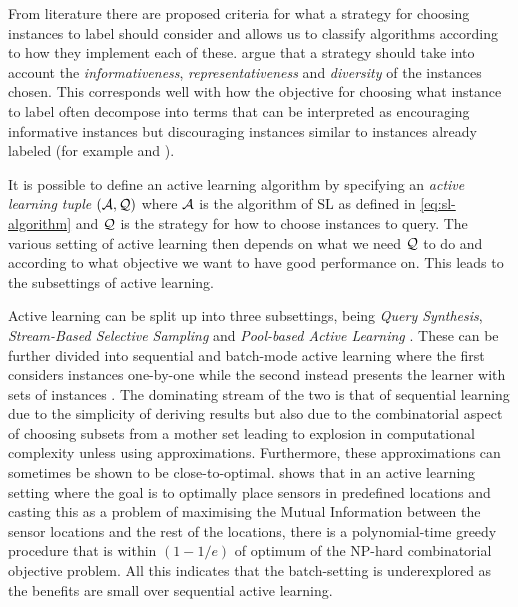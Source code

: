 From literature there are proposed criteria for what a strategy for choosing
instances to label should consider and allows us to classify algorithms
according to how they implement each of these.
\cite{wu18_pool_based_sequen_activ_learn_regres} argue that a strategy should
take into account the \emph{informativeness}, \emph{representativeness} and
\emph{diversity} of the instances chosen. This corresponds well with how the
objective for choosing what instance to label often decompose into terms that
can be interpreted as encouraging informative instances but discouraging instances similar to instances already labeled (for
example \cite[Equation 4]{guo08_discr} and \cite[Equation
7]{chattopadhyay13_batch_mode_activ_sampl_based}).

It is possible to define an active learning algorithm by specifying an
\emph{active learning tuple} \((\mathcal{A}, \mathcal{Q})\) where \(\mathcal{A}\) is the
algorithm of SL as defined in \ref{eq:sl-algorithm} and \(\mathcal{Q}\) is the strategy for how to choose instances
to query. The various setting of active learning then depends on what we need
\(\mathcal{Q}\) to do and according to what objective we want to have good
performance on. This leads to the subsettings of active learning.

Active learning can be split up into three subsettings, being \emph{Query
Synthesis}, \emph{Stream-Based Selective Sampling} and \emph{Pool-based Active
Learning} \cite{settles12_activ_learn}. These can be further divided into
sequential and batch-mode active learning where the first considers instances
one-by-one while the second instead presents the learner with sets of instances
\cite{guo08_discr}. The dominating stream of the two is that of sequential
learning due to the simplicity of deriving results but also due to the
combinatorial aspect of choosing subsets from a mother set leading to explosion
in computational complexity unless using approximations. Furthermore, these
approximations can sometimes be shown to be close-to-optimal.
\cite{krause08_near_optim_sensor_placem_gauss_proces} shows that in an active
learning setting where the goal is to optimally place sensors in predefined
locations and casting this as a problem of maximising the Mutual Information
between the sensor locations and the rest of the locations, there is a
polynomial-time greedy procedure that is within \((1 - 1/e)\) of optimum of the
NP-hard combinatorial objective problem. All this indicates that the
batch-setting is underexplored as the benefits are small over sequential active
learning.


